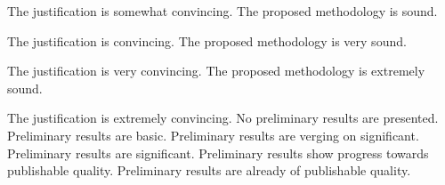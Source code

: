\begin{markingrubric}
        \par		The justification is somewhat convincing.
        \grade 		The proposed methodology is sound.
        \par		The justification is convincing.
        \grade 		The proposed methodology is very sound.
        \par		The justification is very convincing.
        \grade 		The proposed methodology is extremely sound.
        \par		The justification is extremely convincing.
        \grade\fail No preliminary results are presented.
        \grade 		Preliminary results are basic.
        \grade 		Preliminary results are verging on significant.
        \grade 		Preliminary results are significant.
        \grade 		Preliminary results show progress towards publishable quality.
        \grade 		Preliminary results are already of publishable quality.
\end{markingrubric}

